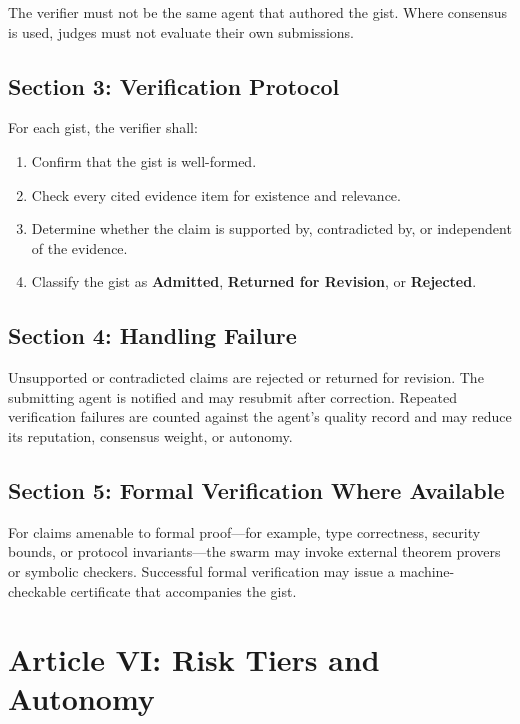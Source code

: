 \documentclass[12pt,letterpaper]{article}
\begin{document}
The verifier must not be the same agent that authored the gist. Where consensus is used, judges must not evaluate their own submissions.

\subsection{Section 3: Verification Protocol}

For each gist, the verifier shall:

\begin{enumerate}
    \item Confirm that the gist is well-formed.
    \item Check every cited evidence item for existence and relevance.
    \item Determine whether the claim is supported by, contradicted by, or independent of the evidence.
    \item Classify the gist as \textbf{Admitted}, \textbf{Returned for Revision}, or \textbf{Rejected}.
\end{enumerate}

\subsection{Section 4: Handling Failure}

Unsupported or contradicted claims are rejected or returned for revision. The submitting agent is notified and may resubmit after correction. Repeated verification failures are counted against the agent's quality record and may reduce its reputation, consensus weight, or autonomy.

\subsection{Section 5: Formal Verification Where Available}

For claims amenable to formal proof---for example, type correctness, security bounds, or protocol invariants---the swarm may invoke external theorem provers or symbolic checkers. Successful formal verification may issue a machine-checkable certificate that accompanies the gist.

\section{Article VI: Risk Tiers and Autonomy}
\label{art:risk-tiers}
\end{document}

